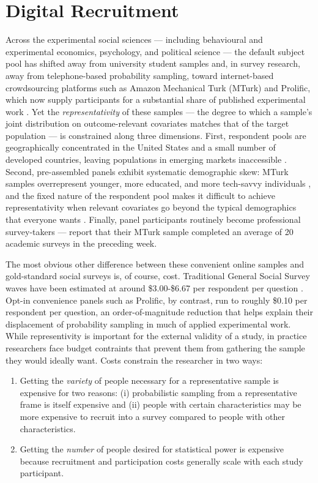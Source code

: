 \section{Digital Recruitment}
\label{sec:intro:digital-recruitment}

Across the experimental social sciences --- including behavioural and experimental economics, psychology, and political science --- the default subject pool has shifted away from university student samples and, in survey research, away from telephone-based probability sampling, toward internet-based crowdsourcing platforms such as Amazon Mechanical Turk (MTurk) and Prolific, which now supply participants for a substantial share of published experimental work \citep{palan2018prolific,yeager2011comparing}. Yet the \emph{representativity} of these samples --- the degree to which a sample's joint distribution on outcome-relevant covariates matches that of the target population --- is constrained along three dimensions. First, respondent pools are geographically concentrated in the United States and a small number of developed countries, leaving populations in emerging markets inaccessible \citep{narasimhan2015marketing}. Second, pre-assembled panels exhibit systematic demographic skew: MTurk samples overrepresent younger, more educated, and more tech-savvy individuals \citep{stewart2015average}, and the fixed nature of the respondent pool makes it difficult to achieve representativity when relevant covariates go beyond the typical demographics that everyone wants \citep{peer2017beyond}. Finally, panel participants routinely become professional survey-takers --- \citet{rand2014social} report that their MTurk sample completed an average of 20 academic surveys in the preceding week. 

The most obvious other difference between these convenient online samples and gold-standard social surveys is, of course, cost. Traditional General Social Survey waves have been estimated at around \$3.00-\$6.67 per respondent per question \citep{goel2015non,norc2024gss}. Opt-in convenience panels such as Prolific, by contrast, run to roughly \$0.10 per respondent per question, an order-of-magnitude reduction that helps explain their displacement of probability sampling in much of applied experimental work. While representivity is important for the external validity of a study, in practice researchers face budget contraints that prevent them from gathering the sample they would ideally want. Costs constrain the researcher in two ways: 

\begin{enumerate}
\item Getting the \emph{variety} of people necessary for a representative sample is expensive for two reasons: (i) probabilistic sampling from a representative frame is itself expensive and (ii) people with certain characteristics may be more expensive to recruit into a survey compared to people with other characteristics. 
\item Getting the \emph{number} of people desired for statistical power is expensive because recruitment and participation costs generally scale with each study participant. 
\end{enumerate}

